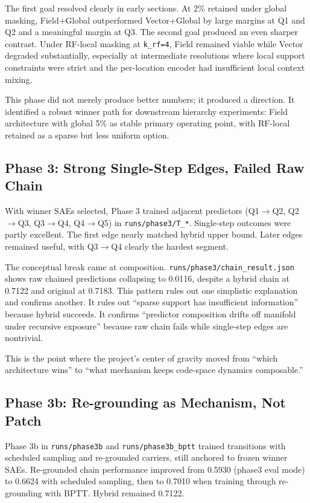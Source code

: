 \documentclass[11pt]{article}
\begin{document}
The first goal resolved clearly in early sections. At 2\% retained under global masking, Field+Global outperformed Vector+Global by large margins at Q1 and Q2 and a meaningful margin at Q3. The second goal produced an even sharper contrast. Under RF-local masking at \texttt{k\_rf=4}, Field remained viable while Vector degraded substantially, especially at intermediate resolutions where local support constraints were strict and the per-location encoder had insufficient local context mixing.

This phase did not merely produce better numbers; it produced a direction. It identified a robust winner path for downstream hierarchy experiments: Field architecture with global 5\% as stable primary operating point, with RF-local retained as a sparse but less uniform option.

\subsection{Phase 3: Strong Single-Step Edges, Failed Raw Chain}
With winner SAEs selected, Phase 3 trained adjacent predictors (Q1$\rightarrow$Q2, Q2$\rightarrow$Q3, Q3$\rightarrow$Q4, Q4$\rightarrow$Q5) in \texttt{runs/phase3/T\_*}. Single-step outcomes were partly excellent. The first edge nearly matched hybrid upper bound. Later edges remained useful, with Q3$\rightarrow$Q4 clearly the hardest segment.

The conceptual break came at composition. \texttt{runs/phase3/chain\_result.json} shows raw chained predictions collapsing to 0.0116, despite a hybrid chain at 0.7122 and original at 0.7183. This pattern rules out one simplistic explanation and confirms another. It rules out ``sparse support has insufficient information'' because hybrid succeeds. It confirms ``predictor composition drifts off manifold under recursive exposure'' because raw chain fails while single-step edges are nontrivial.

This is the point where the project's center of gravity moved from ``which architecture wins'' to ``what mechanism keeps code-space dynamics composable.''

\subsection{Phase 3b: Re-grounding as Mechanism, Not Patch}
Phase 3b in \texttt{runs/phase3b} and \texttt{runs/phase3b\_bptt} trained transitions with scheduled sampling and re-grounded carriers, still anchored to frozen winner SAEs. Re-grounded chain performance improved from 0.5930 (phase3 eval mode) to 0.6624 with scheduled sampling, then to 0.7010 when training through re-grounding with BPTT. Hybrid remained 0.7122.
\end{document}
